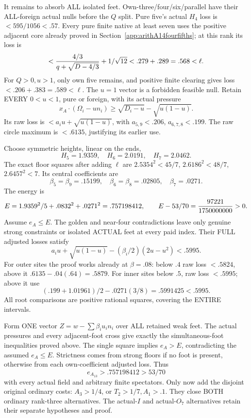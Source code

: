 It remains to absorb ALL isolated feet.
Own-three/four/six/parallel have their ALL-foreign
actual nulls before the \(Q\) split.
Pure five's actual \(H_4\) loss is
\(<595/1056<.57\).
Every pure finite native at least seven uses
the positive adjacent core already proved in
Section~\ref{app:arithA14fourfifths};
at this rank its loss is
\[
        <{4/3\over q+\sqrt{D-4/3}}+1/\sqrt{12}
                       <.279+.289=.568<\ell .
\]
For \(Q>0,u>1\), only own five remains,
and positive finite clearing gives loss
\(<.206+.383=.589<\ell\).
The \(u=1\) vector is a forbidden feasible null.
Retain EVERY \(0<u<1\), pure or foreign,
with its actual pressure
\[
 x_A\cdot(\Omega_i-un_i)\ge
                      \sqrt{D_i-u}-\sqrt{u(1-u)}.
\]
Its raw loss is
\(<a_i u+\sqrt{u(1-u)}\),
with \(a_{5,9}<.206\), \(a_{6,7,8}<.199\).
The raw circle maximum is \(<.6135\),
justifying its earlier use.

Choose symmetric heights, linear on the ends,
\[
                         H_5=1.9359,\quad H_6=2.0191,\quad H_7=2.0462.
\]
The exact floor squares after adding \(\ell\) are
\(2.5354^2<45/7\), \(2.6186^2<48/7\),
\(2.6457^2<7\).
Its central coefficients are
\[
                    \beta_5=\beta_9=.15199,\quad
                    \beta_6=\beta_8=.02805,\quad\beta_7=.0271 .
\]
The energy is
\[
 E=1.9359^2/5+.0832^2+.0271^2=.757198412,\qquad
 E-53/70={97221\over1750000000}>0 .
\]
Assume \(e_A\le E\).
The golden and near-four contradictions leave
only genuine strong constraints or isolated
ACTUAL feet at every paid index.
Their FULL adjusted losses satisfy
\[
               a_i u+\sqrt{u(1-u)}
                          -(\beta_i/2)(2u-u^2)<.5995 .
\]
For outer sites the proof works already at
\(\beta=.08\):
below \(.4\) raw loss \(<.5824\), above it
\(.6135-.04(.64)=.5879\).
For inner sites below \(.5\), raw loss \(<.5995\);
above it use
\[
              (.199+1.01961)/2-.0271(3/8)
                                   =.5991425<.5995 .
\]
All root comparisons are positive rational
squares, covering the ENTIRE intervals.

Form ONE vector \(Z=w-\sum\beta_i u_i n_i\)
over ALL retained weak feet.
The actual pressures and every adjacent-foot
cross give exactly the simultaneous-foot
inequalities proved above.
The single square implies \(e_A>E\),
contradicting the assumed \(e_A\le E\).
Strictness comes from strong floors if no
foot is present, otherwise from each
own-coefficient adjusted loss.
Thus
\[
                             e_{A_{13}}>.757198412>53/70
\tag{A13U}\label{eq:arithA13universal}
\]
with every actual field and arbitrary finite
spectators.
Only now add the disjoint original ordinary
costs: \(A_3>1/4\), or \(T_2>1/7,A_1>.1\).
They close BOTH ordinary rank-three alternatives.
The actual-\(I\) and actual-\(O_7\) alternatives
retain their separate hypotheses and proof.

